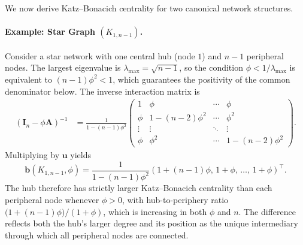 We now derive Katz--Bonacich centrality for two canonical network structures.
\paragraph{Example: Star Graph $(K_{1,n-1})$.}
Consider a star network with one central hub (node $1$) and $n-1$ peripheral
nodes. The largest eigenvalue is $\lambda_{\max}=\sqrt{n-1}$, so the condition
$\phi<1/\lambda_{\max}$ is equivalent to $(n-1)\phi^2<1$, which guarantees the
positivity of the common denominator below. The inverse interaction matrix is
\begin{align*}
(\mathbf I_n-\phi \mathbf A)^{-1}
&=
\frac{1}{1-(n-1)\phi^2}
\begin{pmatrix}
1 & \phi & \cdots & \phi \\
\phi & 1-(n-2)\phi^2 & \cdots & \phi^2 \\
\vdots & \vdots & \ddots & \vdots \\
\phi & \phi^2 & \cdots & 1-(n-2)\phi^2
\end{pmatrix}.
\end{align*}
Multiplying by $\mathbf u$ yields
\begin{equation}
\mathbf b(K_{1,n-1},\phi)
=
\frac{1}{1-(n-1)\phi^2}
\left(
1+(n-1)\phi,\,
1+\phi,\,
\dots,\,
1+\phi
\right)^\top .
\label{eq:bonacich-star}
\end{equation}
The hub therefore has strictly larger Katz--Bonacich centrality than each
peripheral node whenever $\phi>0$, with hub-to-periphery ratio
$\bigl(1+(n-1)\phi\bigr)/(1+\phi)$, which is increasing in both $\phi$ and $n$.
The difference reflects both the hub's larger degree and its position as the
unique intermediary through which all peripheral nodes are connected.

